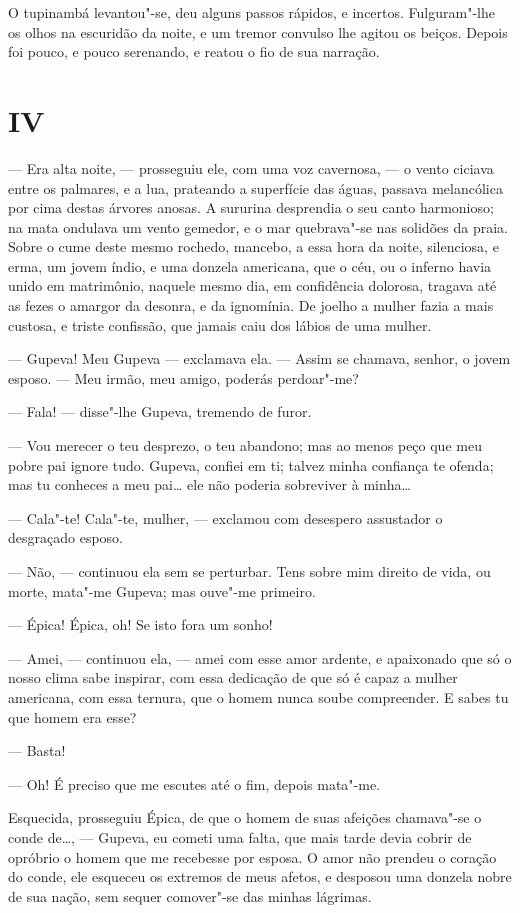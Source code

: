 O tupinambá levantou"-se, deu alguns passos rápidos, e incertos.
Fulguram"-lhe os olhos na escuridão da noite, e um tremor convulso lhe
agitou os beiços. Depois foi pouco, e pouco serenando, e reatou o fio de
sua narração.

\section{IV}

--- Era alta noite, --- prosseguiu ele, com uma voz cavernosa, --- o vento
ciciava entre os palmares, e a lua, prateando a superfície das águas,
passava melancólica por cima destas árvores anosas. A sururina
desprendia o seu canto harmonioso; na mata ondulava um vento gemedor, e
o mar quebrava"-se nas solidões da praia. Sobre o cume deste mesmo
rochedo, mancebo, a essa hora da noite, silenciosa, e erma, um jovem
índio, e uma donzela americana, que o céu, ou o inferno havia unido em
matrimônio, naquele mesmo dia, em confidência dolorosa, tragava até as
fezes o amargor da desonra, e da ignomínia. De joelho a mulher fazia a
mais custosa, e triste confissão, que jamais caiu dos lábios de uma
mulher.

--- Gupeva! Meu Gupeva --- exclamava ela. --- Assim se chamava, senhor, o
jovem esposo. --- Meu irmão, meu amigo, poderás perdoar"-me?

--- Fala! --- disse"-lhe Gupeva, tremendo de furor.

--- Vou merecer o teu desprezo, o teu abandono; mas ao menos peço que
meu pobre pai ignore tudo. Gupeva, confiei em ti; talvez minha confiança
te ofenda; mas tu conheces a meu pai\ldots{} ele não poderia sobreviver à
minha\ldots{}

--- Cala"-te! Cala"-te, mulher, --- exclamou com desespero assustador o
desgraçado esposo.

--- Não, --- continuou ela sem se perturbar. Tens sobre mim direito de
vida, ou morte, mata"-me Gupeva; mas ouve"-me primeiro.

--- Épica! Épica, oh! Se isto fora um sonho!

--- Amei, --- continuou ela, --- amei com esse amor ardente, e apaixonado
que só o nosso clima sabe inspirar, com essa dedicação de que só é capaz
a mulher americana, com essa ternura, que o homem nunca soube
compreender. E sabes tu que homem era esse?

--- Basta!

--- Oh! É preciso que me escutes até o fim, depois mata"-me.

Esquecida, prosseguiu Épica, de que o homem de suas afeições chamava"-se
o conde de\ldots{}, --- Gupeva, eu cometi uma falta, que mais tarde devia
cobrir de opróbrio o homem que me recebesse por esposa. O amor não
prendeu o coração do conde, ele esqueceu os extremos de meus afetos, e
desposou uma donzela nobre de sua nação, sem sequer comover"-se das
minhas lágrimas.

